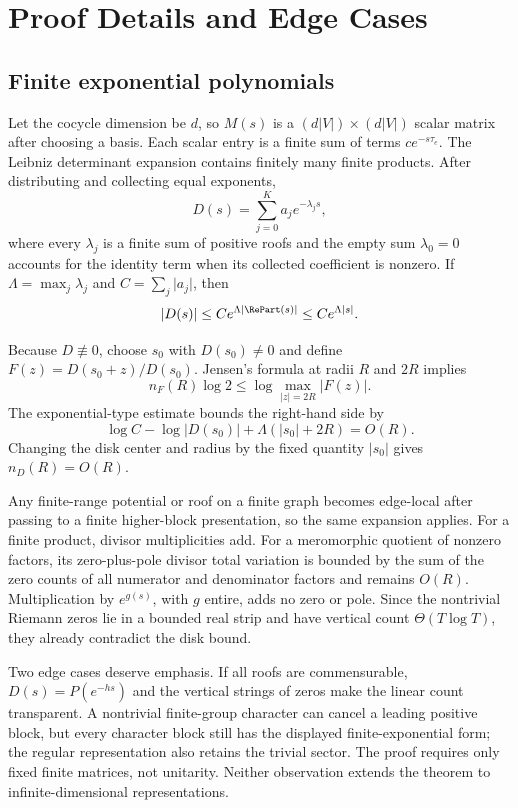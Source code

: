 \section{Proof Details and Edge Cases}
\label{app:proofs}

\subsection{Finite exponential polynomials}
\label{app:finite-memory}

Let the cocycle dimension be \(d\), so \(M(s)\) is a
\((d\lvert V\rvert)\times(d\lvert V\rvert)\) scalar matrix after choosing a
basis.  Each scalar entry is a finite sum of terms \(c e^{-s\tau_e}\).
The Leibniz determinant expansion contains finitely many finite products.
After distributing and collecting equal exponents,
\[
  D(s)=\sum_{j=0}^{K} a_j e^{-\lambda_j s},
\]
where every \(\lambda_j\) is a finite sum of positive roofs and the empty sum
\(\lambda_0=0\) accounts for the identity term when its collected coefficient
is nonzero.  If
\(\Lambda=\max_j\lambda_j\) and \(C=\sum_j\lvert a_j\rvert\), then
\[
  \lvert D(s)\rvert
  \le C e^{\Lambda\lvert\RePart(s)\rvert}
  \le C e^{\Lambda\lvert s\rvert}.
\]

Because \(D\not\equiv0\), choose \(s_0\) with \(D(s_0)\ne0\) and define
\(F(z)=D(s_0+z)/D(s_0)\).  Jensen's formula at radii \(R\) and \(2R\)
implies
\[
  n_F(R)\log 2
  \le \log\max_{\lvert z\rvert=2R}\lvert F(z)\rvert.
\]
The exponential-type estimate bounds the right-hand side by
\[
  \log C-\log\lvert D(s_0)\rvert
  +\Lambda(\lvert s_0\rvert+2R)=O(R).
\]
Changing the disk center and radius by the fixed quantity \(\lvert s_0\rvert\)
gives \(n_D(R)=O(R)\).

Any finite-range potential or roof on a finite graph becomes edge-local after
passing to a finite higher-block presentation, so the same expansion applies.
For a finite product, divisor multiplicities add.  For a meromorphic quotient
of nonzero factors, its zero-plus-pole divisor total variation is bounded by
the sum of the zero counts of all numerator and denominator factors and remains
\(O(R)\).  Multiplication by
\(e^{g(s)}\), with \(g\) entire, adds no zero or pole.  Since the nontrivial
Riemann zeros lie in a bounded real strip and have vertical count
\(\Theta(T\log T)\), they already contradict the disk bound.

Two edge cases deserve emphasis.  If all roofs are commensurable,
\(D(s)=P(e^{-hs})\) and the vertical strings of zeros make the linear count
transparent.  A nontrivial finite-group character can cancel a leading
positive block, but every character block still has the displayed
finite-exponential form; the regular representation also retains the trivial
  sector.  The proof requires only fixed finite matrices, not unitarity.
  Neither observation extends the theorem to infinite-dimensional
representations.

